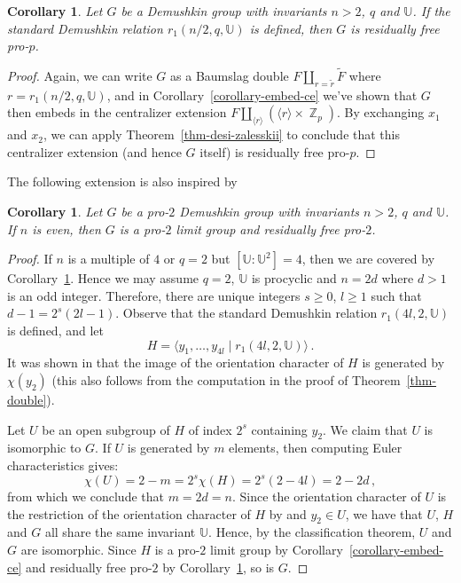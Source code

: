\documentclass[a4paper]{amsart}
\DeclareMathOperator{\bbz}{\mathbb{Z}}
\newtheorem{cor}[thm]{Corollary}
\theoremstyle{definition}
\begin{document}
\begin{cor}\label{cor-residually-free-1} Let \(G\) be a Demushkin group with invariants \(n > 2\), \(q\) and \(\mathbb{U}\). If the standard Demushkin relation \(r_1(n/2,q,\mathbb{U})\) is defined, then \(G\) is residually free pro-\(p\).
\end{cor}
\begin{proof} Again, we can write \(G\) as a Baumslag double \(F \amalg_{r = \widetilde{r}} \widetilde{F}\) where \(r = r_1(n/2,q,\mathbb{U})\), and in Corollary~\ref{corollary-embed-ce} we've shown that \(G\) then embeds in the centralizer extension \(F \amalg_{\langle r \rangle} (\langle r \rangle \times \bbz_p)\). By exchanging \(x_1\) and \(x_2\), we can apply Theorem~\ref{thm-desi-zalesskii} to conclude that this centralizer extension (and hence \(G\) itself) is residually free pro-\(p\).
\end{proof}

The following extension is also inspired by \cite[Cor. 5.2]{kochloukovaFullyResiduallyFree2010}

\begin{cor}\label{cor-q-is-2} Let \(G\) be a pro-\(2\) Demushkin group with invariants \(n > 2\), \(q\) and \(\mathbb{U}\). If \(n\) is even, then \(G\) is a pro-\(2\) limit group and residually free pro-\(2\).
\end{cor}
\begin{proof} If \(n\) is a multiple of \(4\) or \(q = 2\) but \([\mathbb{U}\colon \mathbb{U}^2] = 4\), then we are covered by Corollary~\ref{cor-residually-free-1}. Hence we may assume \(q = 2\), \(\mathbb{U}\) is procyclic and \(n = 2d\) where \(d > 1\) is an odd integer. Therefore, there are unique integers \(s \geq 0\), \(l \geq 1\) such that \(d - 1 = 2^s(2l-1)\). Observe that the standard Demushkin relation \(r_1(4l,2,\mathbb{U})\) is defined, and let \[H = \langle y_1,\ldots,y_{4l}\mid r_1(4l,2,\mathbb{U})\rangle\,.\] It was shown in \cite{labuteClassificationDemushkinGroups1967} that the image of the orientation character of \(H\) is generated by \(\chi(y_2)\) (this also follows from the computation in the proof of Theorem~\ref{thm-double}).

Let \(U\) be an open subgroup of \(H\) of index \(2^s\) containing \(y_2\). We claim that \(U\) is isomorphic to \(G\). If \(U\) is generated by \(m\) elements, then computing Euler characteristics gives: \[\chi(U) = 2 - m = 2^s\chi(H) = 2^s(2-4l) = 2-2d\,,\] from which we conclude that \(m = 2d = n\). Since the orientation character of \(U\) is the restriction of the orientation character of \(H\) by \cite[Prop. I.18]{serreGaloisCohomology1997} and \(y_2 \in U\), we have that \(U\), \(H\) and \(G\) all share the same invariant \(\mathbb{U}\). Hence, by the classification theorem, \(U\) and \(G\) are isomorphic. Since \(H\) is a pro-\(2\) limit group by Corollary~\ref{corollary-embed-ce} and residually free pro-\(2\) by Corollary~\ref{cor-residually-free-1}, so is \(G\).
\end{proof}
\end{document}
